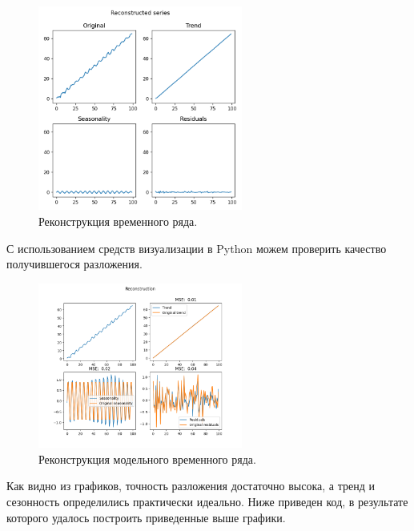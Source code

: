 \documentclass[specialist,
			   substylefile = spbu_report.rtx,
			   subf,href,colorlinks=true, 12pt]{disser}
\begin{document}
\begin{figure}[H]
	\centering
	\includegraphics[width=0.6\textwidth]{mpy_rec}
	\caption{Реконструкция временного ряда.}
	\label{mpy_rec}
\end{figure}

С использованием средств визуализации в Python можем проверить качество получившегося разложения.

\begin{figure}[H]
	\centering
	\includegraphics[width=0.6\textwidth]{mpy_tsr}
	\caption{Реконструкция модельного временного ряда.}
	\label{fig:mpy_tsr}
\end{figure}

Как видно из графиков, точность разложения достаточно высока, а тренд и сезонность определились практически идеально. Ниже приведен код, в результате которого удалось построить приведенные выше графики.
\end{document}
